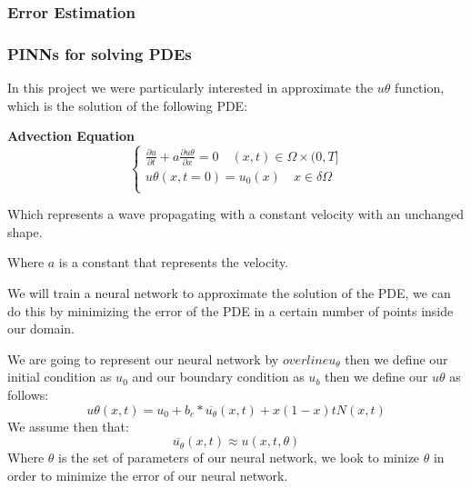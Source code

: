 \documentclass{article}
\begin{document}
\subsubsection{Error Estimation}


\subsubsection{PINNs for solving PDEs} 


In this project we were particularly interested in approximate the $u\theta$ function, which is the solution of the following PDE:

\textbf{Advection Equation}
\begin{equation*}
    \begin{cases}
    \frac{\partial u}{\partial t} + a \frac{\partial u\theta}{\partial x} = 0 \quad (x,t) \in \Omega \times (0,T] \\
    u\theta(x,t=0) = u_0(x) \quad x \in \delta \Omega \\
    \end{cases}
\end{equation*}

Which represents a wave propagating with a constant velocity with an unchanged shape.

Where $a$ is a constant that represents the velocity.

We will train a neural network to approximate the solution of the PDE, we can do this by minimizing the error of the PDE in a certain number of points inside our domain.

We are going to represent our neural network by $overline{u_\theta}$ then we define our initial condition as $u_0$ and our boundary condition as $u_b$ then we define our $u\theta$ as follows:
$$
u\theta(x,t) = u_0 + b_c * \overline{u_\theta}(x,t) + x(1-x)tN(x,t)
$$
We assume then that:
$$\overline{u_\theta}(x,t)\approx u(x,t,\theta)$$ 
Where $\theta$ is the set of parameters of our neural network, we look to minize $\theta$ in order to minimize the error of our neural network.
\end{document}
